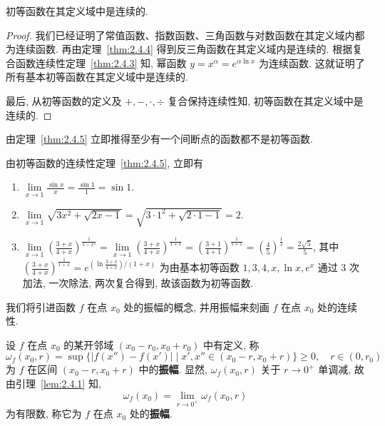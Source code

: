 \begin{theorem}\label{thm:2.4.5}
初等函数在其定义域中是连续的.
\end{theorem}

\begin{proof}
我们已经证明了常值函数、指数函数、三角函数与对数函数在其定义域内都为连续函数. 再由定理~\ref{thm:2.4.4} 得到反三角函数在其定义域内是连续的. 根据复合函数连续性定理~\ref{thm:2.4.3} 知, 幂函数 $y = x^\alpha = e^{\alpha \ln x}$ 为连续函数. 这就证明了所有基本初等函数在其定义域中是连续的.

最后, 从初等函数的定义及 $+,-,\cdot,\div$ 复合保持连续性知, 初等函数在其定义域中是连续的.
\end{proof}

由定理~\ref{thm:2.4.5} 立即推得至少有一个间断点的函数都不是初等函数.

\begin{example}\label{ex:2.4.1}
由初等函数的连续性定理~\ref{thm:2.4.5}, 立即有
\begin{enumerate}[label=(\arabic*)]
  \item $\lim\limits_{x \to 1} \frac{\sin x}{x} = \frac{\sin 1}{1} = \sin 1$.
  \item $\lim\limits_{x \to 1} \sqrt{3x^2 + \sqrt{2x - 1}} = \sqrt{3 \cdot 1^2 + \sqrt{2 \cdot 1 - 1}} = 2$.
  \item $\lim\limits_{x \to 1} \left(\frac{3+x}{4+x}\right)^{\frac{1}{1-x^2}} = \lim\limits_{x \to 1} \left(\frac{3+x}{4+x}\right)^{\frac{1}{1+x}} = \left(\frac{3+1}{4+1}\right)^{\frac{1}{1+1}} = \left(\frac{4}{5}\right)^{\frac{1}{2}} = \frac{2\sqrt{5}}{5}$,
  其中 $\left(\frac{3+x}{4+x}\right)^{\frac{1}{1+x}} = e^{\left(\ln\frac{3+x}{4+x}\right)/(1+x)}$ 为由基本初等函数 $1, 3, 4, x, \ln x, e^x$ 通过 3 次加法, 一次除法, 两次复合得到, 故该函数为初等函数.
\end{enumerate}
\end{example}

我们将引进函数 $f$ 在点 $x_0$ 处的振幅的概念, 并用振幅来刻画 $f$ 在点 $x_0$ 处的连续性.

\begin{definition}\label{def:2.4.2}
设 $f$ 在点 $x_0$ 的某开邻域 $(x_0 - r_0, x_0 + r_0)$ 中有定义, 称
\[
\omega_f(x_0, r) = \sup\{|f(x'') - f(x')| \mid x', x'' \in (x_0 - r, x_0 + r)\} \geqslant 0,\quad r \in (0, r_0)
\]
为 $f$ 在区间 $(x_0 - r, x_0 + r)$ 中的\textbf{振幅}. 显然, $\omega_f(x_0, r)$ 关于 $r \to 0^+$ 单调减, 故由引理~\ref{lem:2.4.1} 知,
\[
\omega_f(x_0) = \lim_{r \to 0^+} \omega_f(x_0, r)
\]
为有限数, 称它为 $f$ 在点 $x_0$ 处的\textbf{振幅}.
\end{definition}

